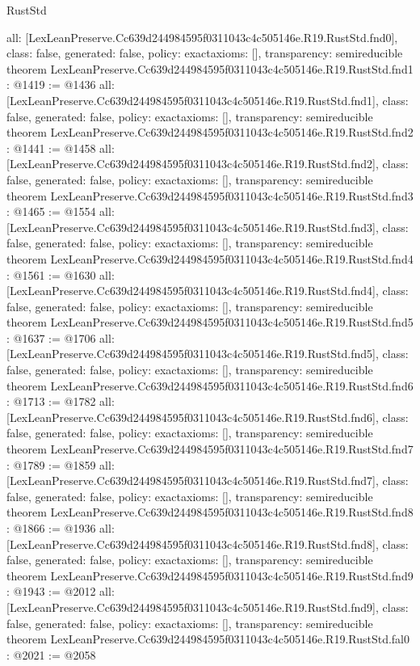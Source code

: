 \begin{lexlean}{RustStd}
\begin{coremodule}
{  all: [LexLeanPreserve.Cc639d244984595f0311043c4c505146e.R19.RustStd.fnd0],
  class: false,
  generated: false,
  policy: exact{axioms: []},
  transparency: semireducible
}
theorem LexLeanPreserve.Cc639d244984595f0311043c4c505146e.R19.RustStd.fnd1 : @1419 := @1436 {
  all: [LexLeanPreserve.Cc639d244984595f0311043c4c505146e.R19.RustStd.fnd1],
  class: false,
  generated: false,
  policy: exact{axioms: []},
  transparency: semireducible
}
theorem LexLeanPreserve.Cc639d244984595f0311043c4c505146e.R19.RustStd.fnd2 : @1441 := @1458 {
  all: [LexLeanPreserve.Cc639d244984595f0311043c4c505146e.R19.RustStd.fnd2],
  class: false,
  generated: false,
  policy: exact{axioms: []},
  transparency: semireducible
}
theorem LexLeanPreserve.Cc639d244984595f0311043c4c505146e.R19.RustStd.fnd3 : @1465 := @1554 {
  all: [LexLeanPreserve.Cc639d244984595f0311043c4c505146e.R19.RustStd.fnd3],
  class: false,
  generated: false,
  policy: exact{axioms: []},
  transparency: semireducible
}
theorem LexLeanPreserve.Cc639d244984595f0311043c4c505146e.R19.RustStd.fnd4 : @1561 := @1630 {
  all: [LexLeanPreserve.Cc639d244984595f0311043c4c505146e.R19.RustStd.fnd4],
  class: false,
  generated: false,
  policy: exact{axioms: []},
  transparency: semireducible
}
theorem LexLeanPreserve.Cc639d244984595f0311043c4c505146e.R19.RustStd.fnd5 : @1637 := @1706 {
  all: [LexLeanPreserve.Cc639d244984595f0311043c4c505146e.R19.RustStd.fnd5],
  class: false,
  generated: false,
  policy: exact{axioms: []},
  transparency: semireducible
}
theorem LexLeanPreserve.Cc639d244984595f0311043c4c505146e.R19.RustStd.fnd6 : @1713 := @1782 {
  all: [LexLeanPreserve.Cc639d244984595f0311043c4c505146e.R19.RustStd.fnd6],
  class: false,
  generated: false,
  policy: exact{axioms: []},
  transparency: semireducible
}
theorem LexLeanPreserve.Cc639d244984595f0311043c4c505146e.R19.RustStd.fnd7 : @1789 := @1859 {
  all: [LexLeanPreserve.Cc639d244984595f0311043c4c505146e.R19.RustStd.fnd7],
  class: false,
  generated: false,
  policy: exact{axioms: []},
  transparency: semireducible
}
theorem LexLeanPreserve.Cc639d244984595f0311043c4c505146e.R19.RustStd.fnd8 : @1866 := @1936 {
  all: [LexLeanPreserve.Cc639d244984595f0311043c4c505146e.R19.RustStd.fnd8],
  class: false,
  generated: false,
  policy: exact{axioms: []},
  transparency: semireducible
}
theorem LexLeanPreserve.Cc639d244984595f0311043c4c505146e.R19.RustStd.fnd9 : @1943 := @2012 {
  all: [LexLeanPreserve.Cc639d244984595f0311043c4c505146e.R19.RustStd.fnd9],
  class: false,
  generated: false,
  policy: exact{axioms: []},
  transparency: semireducible
}
theorem LexLeanPreserve.Cc639d244984595f0311043c4c505146e.R19.RustStd.fal0 : @2021 := @2058 {
}
\end{coremodule}
\end{lexlean}
